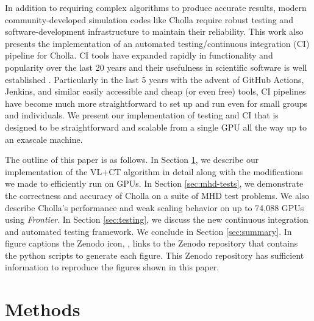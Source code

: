 \documentclass[modern, linenumbers]{aastex631}
\newcommand*{\img}[1]{%
    \raisebox{-.05\baselineskip}{%
        \texttt{[image: \#1]}%
    }%
}
\begin{document}
In addition to requiring complex algorithms to produce accurate results, modern community-developed simulation codes like Cholla require robust testing and software-development infrastructure to maintain their reliability. This work also presents the implementation of an automated testing/continuous integration (CI) pipeline for Cholla. CI tools have expanded rapidly in functionality and popularity over the last 20 years and their usefulness in scientific software is well established \citep{beck_1999, wilson_2014,wilson_2017}. Particularly in the last 5 years with the advent of GitHub Actions, Jenkins, and similar easily accessible and cheap (or even free) tools, CI pipelines have become much more straightforward to set up and run even for small groups and individuals. We present our implementation of testing and CI that is designed to be straightforward and scalable from a single GPU all the way up to an exascale machine.

The outline of this paper is as follows. In Section \ref{sec:methods}, we describe our implementation of the VL+CT algorithm in detail along with the modifications we made to efficiently run on GPUs. In Section \ref{sec:mhd-tests}, we demonstrate the correctness and accuracy of Cholla on a suite of MHD test problems. We also describe Cholla's performance and weak scaling behavior on up to 74,088 GPUs using \textit{Frontier}. In Section \ref{sec:testing}, we discuss the new continuous integration and automated testing framework. We conclude in Section \ref{sec:summary}. In figure captions the Zenodo icon, \img{zenodo-gradient-200.png}, links to the Zenodo repository that contains the python scripts to generate each figure. This Zenodo repository has sufficient information to reproduce the figures shown in this paper.


\section{Methods}
\label{sec:methods}

\end{document}
